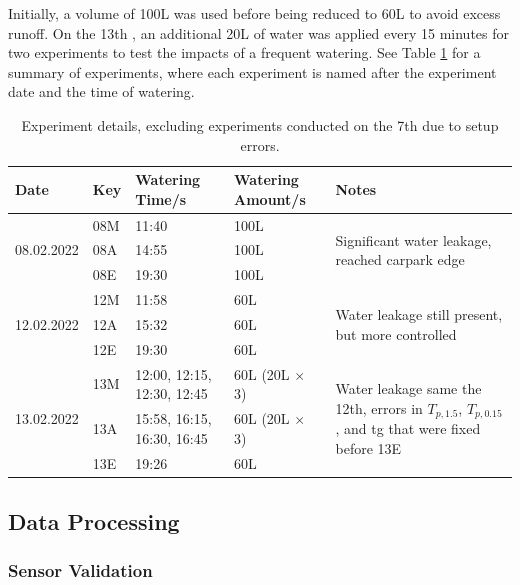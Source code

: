 \documentclass[final,3p,times,authoryear]{elsarticle}
\begin{document}
Initially, a volume of 100L was used before being reduced to 60L to avoid excess runoff. On the 13th , an additional 20L of water was applied every 15 minutes for two experiments to test the impacts of a frequent watering. See Table \ref{table:2.2} for a summary of experiments, where each experiment is named after the experiment date and the time of watering.

\begin{table}[!ht]\caption{Experiment details, excluding experiments conducted on the 7th due to setup errors.}
    \centering
    \begin{tabular}{|p{2.0cm}|p{2.0cm}|p{2.0cm}|p{2.0cm}|p{4.0cm}|}
    \hline
        Date & Key & Watering Time/s & Watering Amount/s & Notes \\ \hline
        \multirow{3}{2pt}{08.02.2022} & 08M & 11:40 & 100L & \multirow{3}{*}{\parbox{4cm}{Significant water leakage, reached carpark edge}} \\
         ~ & 08A & 14:55 & 100L & ~ \\ 
         ~ & 08E & 19:30 & 100L & ~ \\ \hline
         \multirow{3}{2pt}{12.02.2022} & 12M & 11:58 & 60L & \multirow{3}{*}{\parbox{4cm}{Water leakage still present, but more controlled}} \\
          ~ & 12A & 15:32 & 60L & ~ \\ 
          ~ & 12E & 19:30 & 60L & ~ \\ \hline
        \multirow{3}{2pt}{13.02.2022} & 13M & 12:00, 12:15, 12:30, 12:45 & 60L (20L $\times$ 3) & \multirow{3}{*}{\parbox{4cm}{Water leakage same the 12th, errors in $T_{p,1.5}$, $T_{p,0.15}$, and \gls{tg} that were fixed before 13E}} \\
         ~ & 13A & 15:58, 16:15, 16:30, 16:45 & 60L (20L $\times$ 3) & ~ \\ 
         ~ & 13E & 19:26 & 60L & ~ \\ \hline
    \end{tabular}\label{table:2.2}
\end{table}

\subsection{Data Processing}\label{sec:methods2.2}
\subsubsection{Sensor Validation}\label{sec:methods2.2.1}
\end{document}
